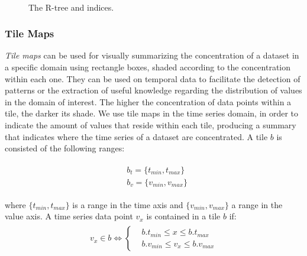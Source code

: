 \begin{figure}[!t]
 \centering
 \
\caption{The R-tree and \btsr indices.}
\label{fig:trees}
\end{figure}

\subsubsection{Tile Maps} {\em Tile maps} can be used for visually summarizing the concentration of a dataset in a specific domain using rectangle boxes, shaded according to the concentration within each one. They can be used on temporal data to facilitate the detection of patterns or the extraction of useful knowledge regarding the distribution of values in the domain of interest. The higher the concentration of data points within a tile, the darker its shade. We use tile maps in the time series domain, in order to indicate the amount of values that reside within each tile, producing a summary that indicates where the time series of a dataset are concentrated. A tile $b$ is consisted of the following ranges:

\begin{align}\label{eq:tile1}
 \begin{split}
  & b_t = \{t_{min}, t_{max}\} \\
  & b_v = \{v_{min}, v_{max}\}
 \end{split}
\end{align}

\noindent where $\{t_{min}, t_{max}\}$ is a range in the time axis and $\{v_{min}, v_{max}\}$ a range in the value axis. A time series data point $v_x$ is contained in a tile $b$ if:
\begin{align}\label{eq:tile2}
 \begin{split}
  v_x \in b \iff \begin{cases}
  &b.t_{min} \leq x \leq b.t_{max}\\
  &b.v_{min} \leq v_x \leq b.v_{max}
  \end{cases}
 \end{split}
\end{align}

